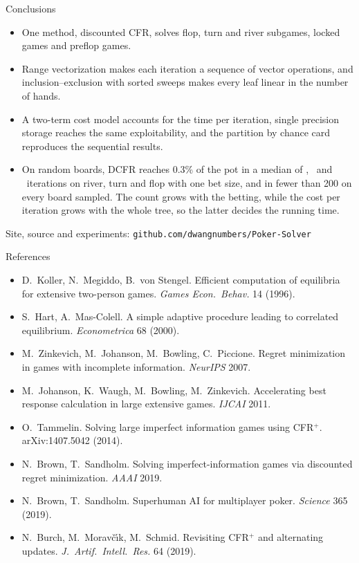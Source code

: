 \documentclass[10pt,aspectratio=169]{beamer}
\begin{document}
\begin{frame}{Conclusions}
\begin{itemize}[<+->]\setlength\itemsep{6pt}
\item One method, discounted CFR, solves flop, turn and river subgames, locked games and preflop games.
\item Range vectorization makes each iteration a sequence of vector operations, and inclusion--exclusion with sorted
sweeps makes every leaf linear in the number of hands.
\item A two-term cost model accounts for the time per iteration, single precision storage reaches the same
exploitability, and the partition by chance card reproduces the sequential results.
\item On random boards, DCFR reaches 0.3\% of the pot in a median of \SampRiverOneMed, \SampTurnOneMed\ and
\SampFlopOneMed\ iterations on river, turn and flop with one bet size, and in fewer than 200 on every board sampled. The count
grows with the betting, while the cost per iteration grows with the whole tree, so the latter decides the running time.
\end{itemize}
\vfill
{\small Site, source and experiments: \texttt{github.com/dwangnumbers/Poker-Solver}}
\end{frame}

\begin{frame}{References}
\footnotesize
\begin{itemize}\setlength\itemsep{1pt}
\item D.~Koller, N.~Megiddo, B.~von Stengel. Efficient computation of equilibria for extensive two-person games. \emph{Games Econ.\ Behav.} 14 (1996).
\item S.~Hart, A.~Mas-Colell. A simple adaptive procedure leading to correlated equilibrium. \emph{Econometrica} 68 (2000).
\item M.~Zinkevich, M.~Johanson, M.~Bowling, C.~Piccione. Regret minimization in games with incomplete information. \emph{NeurIPS} 2007.
\item M.~Johanson, K.~Waugh, M.~Bowling, M.~Zinkevich. Accelerating best response calculation in large extensive games. \emph{IJCAI} 2011.
\item O.~Tammelin. Solving large imperfect information games using CFR$^+$. arXiv:1407.5042 (2014).
\item N.~Brown, T.~Sandholm. Solving imperfect-information games via discounted regret minimization. \emph{AAAI} 2019.
\item N.~Brown, T.~Sandholm. Superhuman AI for multiplayer poker. \emph{Science} 365 (2019).
\item N.~Burch, M.~Morav\v{c}\'{\i}k, M.~Schmid. Revisiting CFR$^+$ and alternating updates. \emph{J.\ Artif.\ Intell.\ Res.} 64 (2019).
\end{itemize}
\end{frame}
\end{document}
